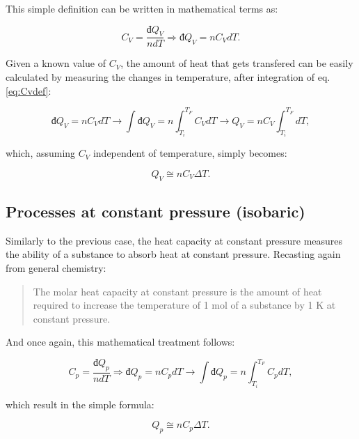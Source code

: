 \documentclass[
]{book}
\theoremstyle{definition}
\theoremstyle{definition}
\theoremstyle{definition}
\theoremstyle{remark}
\begin{document}
This simple definition can be written in mathematical terms as:

\begin{equation}
  C_V = \frac{đ Q_V}{n dT} \Rightarrow đ Q_V = n C_V dT.
  \label{eq:Cvdef}
\end{equation}

Given a known value of \(C_V\), the amount of heat that gets transfered can be easily calculated by measuring the changes in temperature, after integration of eq. \eqref{eq:Cvdef}:

\begin{equation}
  đ Q_V = n C_V dT \rightarrow \int đ Q_V = n \int_{T_i}^{T_F}C_V dT \rightarrow Q_V = n C_V \int_{T_i}^{T_F}dT,
  \label{eq:Cvint1}
\end{equation}

which, assuming \(C_V\) independent of temperature, simply becomes:

\begin{equation}
  Q_V \cong n C_V \Delta T.
  \label{eq:Cvint}
\end{equation}

\hypertarget{heatconstp}{%
\subsection{Processes at constant pressure (isobaric)}\label{heatconstp}}

Similarly to the previous case, the heat capacity at constant pressure measures the ability of a substance to absorb heat at constant pressure. Recasting again from general chemistry:

\begin{quote}
The molar heat capacity at constant pressure is the amount of heat required to increase the temperature of 1 mol of a substance by 1 K at constant pressure.
\end{quote}

And once again, this mathematical treatment follows:

\begin{equation}
  C_p = \frac{đ Q_p}{n dT} \Rightarrow đ Q_p = n C_p dT \rightarrow \int đ Q_p = n \int_{T_i}^{T_F}C_p dT,
  \label{eq:Cpdef}
\end{equation}

which result in the simple formula:

\begin{equation}
  Q_p \cong n C_p \Delta T.
  \label{eq:Cpint}
\end{equation}
\end{document}
